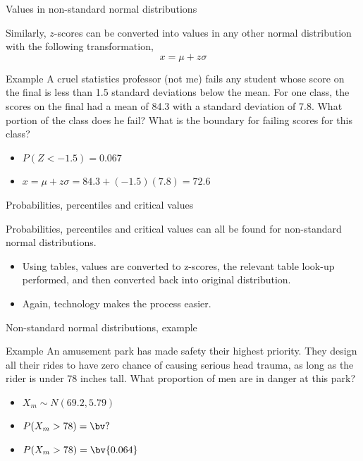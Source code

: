 \documentclass[xcolor=table, handout]{beamer}
\begin{document}
\begin{frame}{Values in non-standard normal distributions}
\begin{block}{}
Similarly, $z$-scores can be converted into values in any other normal distribution with the following transformation,
\[x = \mu + z \sigma\]
\end{block}

\pause
\begin{exampleblock}{Example}
A cruel statistics professor (not me) fails any student whose score on the final is less than 1.5 standard deviations below the mean. For one class, the scores on the final had a mean of 84.3 with a standard deviation of 7.8. What portion of the class does he fail? What is the boundary for failing scores for this class?
\begin{itemize}
\pause\item $P(Z < -1.5) = 0.067$
\pause\item $x = \mu + z \sigma = 84.3 + (-1.5) (7.8) = 72.6$
\end{itemize} 
\end{exampleblock}
\end{frame}

\begin{frame}{Probabilities, percentiles and critical values}
\begin{block}{}
Probabilities, percentiles and critical values can all be found for non-standard normal distributions.
\begin{itemize}
\item Using tables, values are converted to z-scores, the relevant table look-up performed, and then converted back into original distribution.
\item Again, technology makes the process easier.
\end{itemize}
\end{block}
\end{frame}

\begin{frame}{Non-standard normal distributions, example}
\begin{exampleblock}{Example}
An amusement park has made safety their highest priority. They design all their rides to have zero chance of causing serious head trauma, as long as the rider is under 78 inches tall. What proportion of men are in danger at this park?
\begin{itemize}
\pause\item $X_m \sim N(69.2, 5.79)$
\pause\item $P(X_m > 78) = \bv ?$
\pause\item $P(X_m > 78) = \bv{0.064}$
\end{itemize}

\end{exampleblock}
\end{frame}
\end{document}
